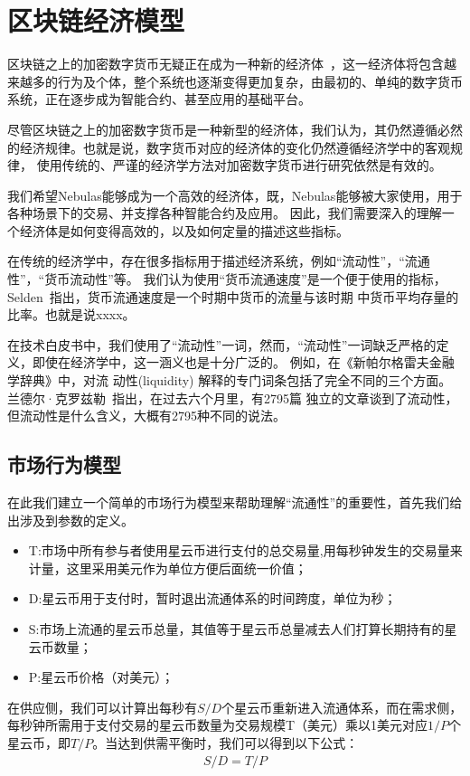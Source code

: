 
\section{区块链经济模型}
区块链之上的加密数字货币无疑正在成为一种新的经济体~\cite{neweco}，这一经济体将包含越来越多的行为及个体，整个系统也逐渐变得更加复杂，由最初的、单纯的数字货币系统，正在逐步成为智能合约、甚至应用的基础平台。

尽管区块链之上的加密数字货币是一种新型的经济体，我们认为，其仍然遵循必然的经济规律。也就是说，数字货币对应的经济体的变化仍然遵循经济学中的客观规律，
使用传统的、严谨的经济学方法对加密数字货币进行研究依然是有效的。

我们希望Nebulas能够成为一个高效的经济体，既，Nebulas能够被大家使用，用于各种场景下的交易、并支撑各种智能合约及应用。
因此，我们需要深入的理解一个经济体是如何变得高效的，以及如何定量的描述这些指标。

在传统的经济学中，存在很多指标用于描述经济系统，例如``流动性''，``流通性''，``货币流动性''等。
我们认为使用``货币流通速度''是一个便于使用的指标，Selden~\cite{selden}指出，货币流通速度是一个时期中货币的流量与该时期
中货币平均存量的比率。也就是说xxxx。


{\color{gray} 在技术白皮书中，我们使用了``流动性''一词，然而，``流动性''一词缺乏严格的定义，即使在经济学中，这一涵义也是十分广泛的。
例如，在《新帕尔格雷夫金融学辞典》中，对流
动性(liquidity) 解释的专门词条包括了完全不同的三个方面。兰德尔·克罗兹勒~\cite{randall}指出，在过去六个月里，有2795篇
独立的文章谈到了流动性，但流动性是什么含义，大概有2795种不同的说法。}

\subsection{市场行为模型}
在此我们建立一个简单的市场行为模型来帮助理解“流通性”的重要性，首先我们给出涉及到参数的定义。
\begin{itemize}
\item{T:市场中所有参与者使用星云币进行支付的总交易量,用每秒钟发生的交易量来计量，这里采用美元作为单位方便后面统一价值；}
\item{D:星云币用于支付时，暂时退出流通体系的时间跨度，单位为秒；}
\item{S:市场上流通的星云币总量，其值等于星云币总量减去人们打算长期持有的星云币数量；}
\item{P:星云币价格（对美元）；}
\end{itemize}
在供应侧，我们可以计算出每秒有$S/D$个星云币重新进入流通体系，而在需求侧，每秒钟所需用于支付交易的星云币数量为交易规模T（美元）乘以1美元对应$1/P$个星云币，即$T/P$。当达到供需平衡时，我们可以得到以下公式：
\begin{align}
S/D=T/P
\end{align}

